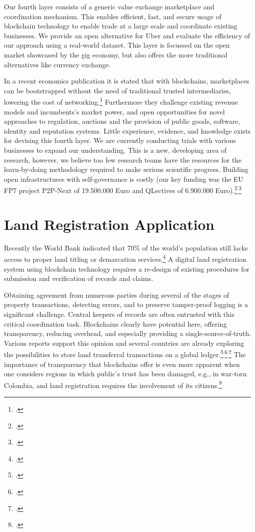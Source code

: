 \documentclass[USenglish]{article}
\begin{document}
Our fourth layer consists of a generic value exchange marketplace and coordination mechanism.
This enables efficient, fast, and secure usage of blockchain technology to enable trade at a large scale and coordinate existing businesses.
We provide an open alternative for Uber and evaluate the efficiency of our approach using a real-world dataset.
This layer is focussed on the open market showcased by the gig economy, but also offers the more traditional alternatives like currency exchange.

In a recent economics publication it is stated that with blockchains, marketplaces can be bootstrapped without the need of traditional trusted intermediaries, lowering the cost of networking.\footcite{catalini2016some}
Furthermore they challenge existing revenue models and incumbents's market power, and open opportunities for novel approaches to regulation, auctions and the provision of public goods, software, identity and reputation systems.
Little experience, evidence, and knowledge exists for devising this fourth layer.
We are currently conducting trials with various businesses to expand our understanding.
This is a new, developing area of research, however, we believe too few research teams have the resources for the learn-by-doing methodology required to make serious scientific progress.
Building open infrastructures with self-governance is costly (our key funding was the EU FP7 project P2P-Next of 19.500.000 Euro and QLectives of 6.900.000 Euro).\footcite{p2pnextfunding}\,\footcite{qlectivefunding}

\section{Land Registration Application}

Recently the World Bank indicated that 70\% of the world’s population still lacks access to proper land titling or demarcation services.\footcite{ieglandadministration}
A digital land registration system using blockchain technology requires a re-design of existing procedures for submission and verification of records and claims.

Obtaining agreement from numerous parties during several of the stages of property transactions, detecting errors, and to preserve tamper-proof logging is a significant challenge.
Central keepers of records are often entrusted with this critical coordination task.
Blockchains clearly have potential here, offering transparency, reducing overhead, and especially providing a single-source-of-truth.
Various reports support this opinion and several countries are already exploring the possibilities to store land transferral transactions on a global ledger.\footcite{deloitteblockchain}\,\footcite{coindesklandregistration}\,\footcite{forbeslandtiles}
The importance of transparency that blockchains offer is even more apparent when one considers regions in which public's trust has been damaged, e.g., in war-torn Colombia, and land registration requires the involvement of its citizens.\footcite{landrightscolumbia}
\end{document}
